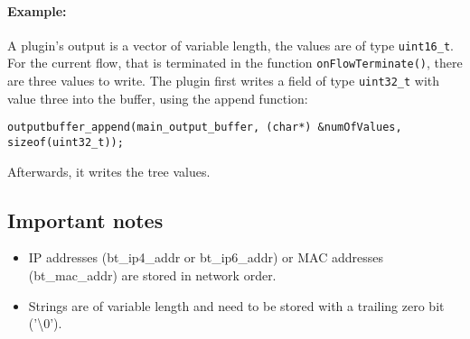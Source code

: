 \documentclass[documentation]{subfiles}
\begin{document}
\paragraph{Example:}
A plugin's output is a vector of variable length, the values are of type {\tt uint16\_t}. For the current flow, that is terminated in the function {\tt onFlowTerminate()}, there are three values to write. The plugin first writes a field of type {\tt uint32\_t} with value three into the buffer, using the append function:
\begin{lstlisting}
outputbuffer_append(main_output_buffer, (char*) &numOfValues, sizeof(uint32_t));
\end{lstlisting}
Afterwards, it writes the tree values.

\subsection{Important notes}
\begin{itemize}
    \item IP addresses (bt\_ip4\_addr or bt\_ip6\_addr) or MAC addresses (bt\_mac\_addr) are stored in network order.
    \item Strings are of variable length and need to be stored with a trailing zero bit ('\textbackslash0').
\end{itemize}
\end{document}
